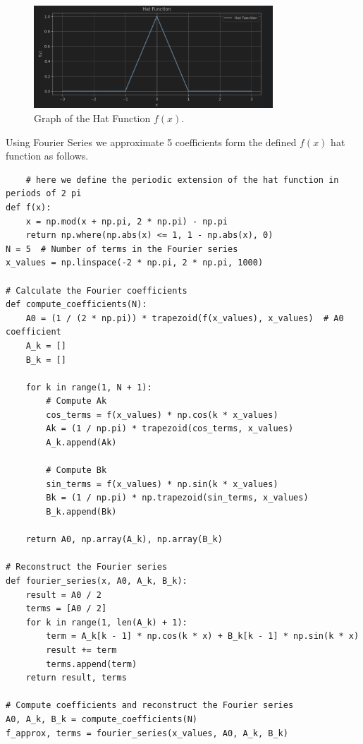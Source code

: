 \documentclass{article}
\begin{document}
\begin{itemize}
{    \begin{figure}[H] 
    \centering
    \includegraphics[width=0.8\textwidth]{image1.png}
    \caption{Graph of the Hat Function \( f(x) \).}
    \label{fig:hat_function}
    \end{figure}
    
    Using Fourier Series we approximate 5 coefficients form the defined $f(x)$ hat function as follows.

    
    \begin{verbatim}
    # here we define the periodic extension of the hat function in periods of 2 pi
def f(x):
    x = np.mod(x + np.pi, 2 * np.pi) - np.pi
    return np.where(np.abs(x) <= 1, 1 - np.abs(x), 0)
N = 5  # Number of terms in the Fourier series
x_values = np.linspace(-2 * np.pi, 2 * np.pi, 1000) 

# Calculate the Fourier coefficients
def compute_coefficients(N):
    A0 = (1 / (2 * np.pi)) * trapezoid(f(x_values), x_values)  # A0 coefficient
    A_k = []
    B_k = []

    for k in range(1, N + 1):
        # Compute Ak
        cos_terms = f(x_values) * np.cos(k * x_values)
        Ak = (1 / np.pi) * trapezoid(cos_terms, x_values)
        A_k.append(Ak)

        # Compute Bk
        sin_terms = f(x_values) * np.sin(k * x_values)
        Bk = (1 / np.pi) * np.trapezoid(sin_terms, x_values)
        B_k.append(Bk)

    return A0, np.array(A_k), np.array(B_k)

# Reconstruct the Fourier series
def fourier_series(x, A0, A_k, B_k):
    result = A0 / 2 
    terms = [A0 / 2] 
    for k in range(1, len(A_k) + 1):
        term = A_k[k - 1] * np.cos(k * x) + B_k[k - 1] * np.sin(k * x)
        result += term
        terms.append(term)
    return result, terms

# Compute coefficients and reconstruct the Fourier series
A0, A_k, B_k = compute_coefficients(N)
f_approx, terms = fourier_series(x_values, A0, A_k, B_k)
    

\end{verbatim}}
\end{itemize}
\end{document}
